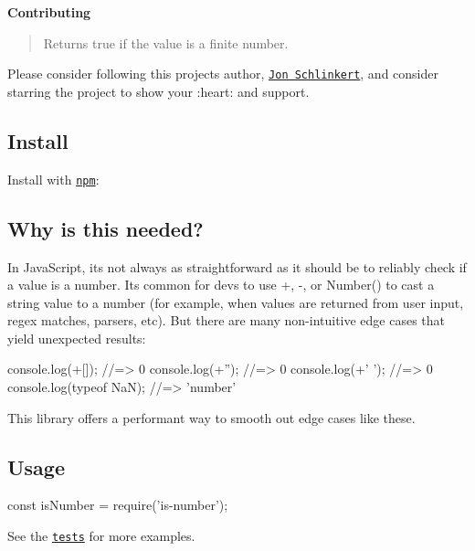 {\bfseries Contributing}

\begin{quote}
Returns true if the value is a finite number. \end{quote}


Please consider following this project\textquotesingle{}s author, \href{https://github.com/jonschlinkert}{\tt Jon Schlinkert}, and consider starring the project to show your \+:heart\+: and support.

\subsection*{Install}

Install with \href{https://www.npmjs.com/}{\tt npm}\+:




\subsection*{Why is this needed?}

In Java\+Script, it\textquotesingle{}s not always as straightforward as it should be to reliably check if a value is a number. It\textquotesingle{}s common for devs to use {\ttfamily +}, {\ttfamily -\/}, or {\ttfamily Number()} to cast a string value to a number (for example, when values are returned from user input, regex matches, parsers, etc). But there are many non-\/intuitive edge cases that yield unexpected results\+:


\begin{DoxyCode}
console.log(+[]); //=> 0
console.log(+''); //=> 0
console.log(+'   '); //=> 0
console.log(typeof NaN); //=> 'number'
\end{DoxyCode}


This library offers a performant way to smooth out edge cases like these.

\subsection*{Usage}


\begin{DoxyCode}
const isNumber = require('is-number');
\end{DoxyCode}


See the \href{./test.js}{\tt tests} for more examples.

